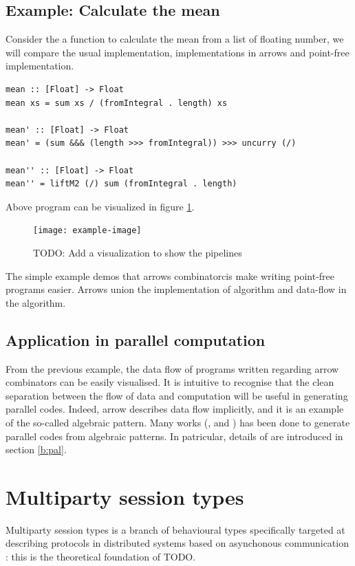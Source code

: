 \subsection{Example: Calculate the mean}
Consider the a function to calculate the mean from a list of floating number, we will compare the usual implementation, implementations in arrows and point-free implementation.
\begin{verbatim}
mean :: [Float] -> Float
mean xs = sum xs / (fromIntegral . length) xs

mean' :: [Float] -> Float
mean' = (sum &&& (length >>> fromIntegral)) >>> uncurry (/)

mean'' :: [Float] -> Float
mean'' = liftM2 (/) sum (fromIntegral . length)
\end{verbatim}
Above program can be visualized in figure \ref{b:ar:p2}.
\begin{figure}[ht]
  \centering
  \texttt{[image: example-image]} 
  \caption{TODO: Add a visualization to show the pipelines}\label{b:ar:p2}
\end{figure}
The simple example demos that arrows combinatorcis make writing point-free programs easier. Arrows union the implementation of algorithm and data-flow in the algorithm. 

\subsection{Application in parallel computation}
From the previous example, the data flow of programs written regarding arrow combinators can be easily visualised. It is intuitive to recognise that the clean separation between the flow of data and computation will be useful in generating parallel codes. Indeed, arrow describes data flow implicitly, and it is an example of the so-called algebraic pattern. Many works (\cite{braunArrowsParallelComputation2018}, \cite{elliottGenericFunctionalParallel2017b} and \cite{authorAlgebraicMultipartyProtocol2018}) has been done to generate parallel codes from algebraic patterns.
In patricular, details of \cite{authorAlgebraicMultipartyProtocol2018} are introduced in section \ref{b:pal}.

\section{Multiparty session types} \label{b:mpst}
Multiparty session types is a branch of behavioural types specifically targeted at describing protocols in distributed systems based on asynchonous communication \cite{coppoGentleIntroductionMultiparty2015}: this is the theoretical foundation of TODO.

